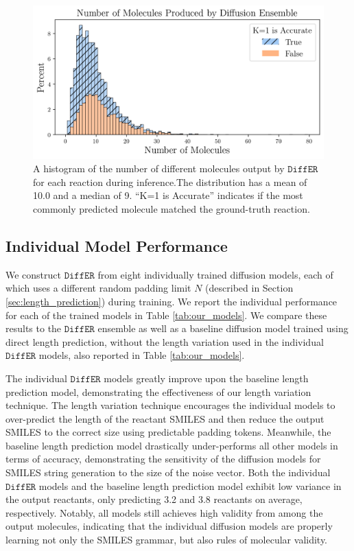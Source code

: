 \documentclass{article}
\newcommand{\ours}{$\texttt{DiffER}$\xspace}
\begin{document}
\begin{figure}[h]
    \small
    \centering
    \includegraphics[width=0.7\linewidth]{images/num_samples_histogram.png}
    \caption{A histogram of the number of different molecules output by \ours for each reaction during inference.The distribution has a mean of 10.0 and a median of 9. ``K=1 is Accurate'' indicates if the most commonly predicted molecule matched the ground-truth reaction.}
    \label{fig:num_samples}
\end{figure}

\subsection{Individual Model Performance}

We construct \ours from eight individually trained diffusion models, each of which uses a different random padding limit $N$ (described in Section \ref{sec:length_prediction}) during training. We report the individual performance for each of the trained models in Table \ref{tab:our_models}. We compare these results to the \ours ensemble as well as a baseline diffusion model trained using direct length prediction, without the length variation used in the individual \ours models, also reported in Table \ref{tab:our_models}.

The individual \ours models greatly improve upon the baseline length prediction model, demonstrating the effectiveness of our length variation technique. The length variation technique encourages the individual models to over-predict the length of the reactant SMILES and then reduce the output SMILES to the correct size using predictable padding tokens. Meanwhile, the baseline length prediction model drastically under-performs all other models in terms of accuracy, demonstrating the sensitivity of the diffusion models for SMILES string generation to the size of the noise vector. Both the individual \ours models and the baseline length prediction model exhibit low variance in the output reactants, only predicting 3.2 and 3.8 reactants on average, respectively. Notably, all models still achieves high validity from among the output molecules, indicating that the individual diffusion models are properly learning not only the SMILES grammar, but also rules of molecular validity.
\end{document}
